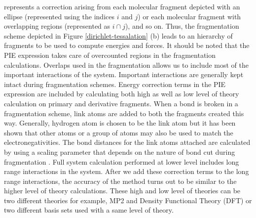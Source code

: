 \noindent represents a correction arising from each molecular fragment
depicted with an ellipse (represented using the indices $i$ and $j$) or each
molecular fragment with overlapping regions (represented as $i\cap j$), and so
on. Thus, the fragmentation scheme depicted in Figure \ref{dirichlet-tessalation}
(b) leads to an hierarchy of fragments to be used to compute energies and forces.
It should be noted that the PIE expression takes care of overcounted regions
in the fragmentation calculations. Overlaps used in the fragmentation allows
us to include most of the important interactions of the system. Important
interactions are generally kept intact during fragmentation schemes. Energy
correction terms in the PIE expression are included by calculating both high
as well as low level of theory calculation on primary and derivative
fragments. When a bond is broken in a fragmentation scheme, link atoms are
added to both the fragments created this way. Generally, hydrogen atom is
chosen to be the link atom but it has been shown \cite{qwaimdqmmm} that other
atoms or a group of atoms may also be used to match the electronegativities.
The bond distances for the link atoms attached are calculated by using
a scaling parameter that depends on the nature of bond cut during fragmentation
\cite{dapprich1999new}. Full system calculation performed at lower level
includes long range interactions in the system. After we add these correction
terms to the long range interactions, the accuracy of the method turns out
to be similar to the higher level of theory calculations. These high and low
level of theories can be two different theories for example, MP2
and Density Functional Theory (DFT) or two
different basis sets used with a same level of theory.

